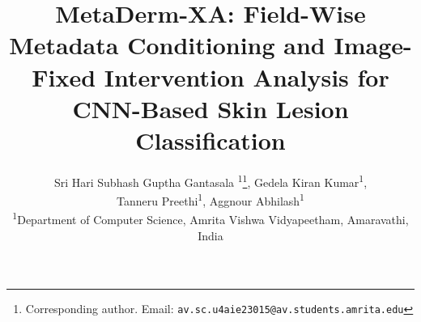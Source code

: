 \documentclass[12pt, a4paper]{article}
\begin{document}
\title{MetaDerm-XA: Field-Wise Metadata Conditioning and Image-Fixed Intervention Analysis for CNN-Based Skin Lesion Classification}

\author{
    Sri Hari Subhash Guptha Gantasala \textsuperscript{1}\thanks{Corresponding author. Email: \texttt{av.sc.u4aie23015@av.students.amrita.edu}},
    Gedela Kiran Kumar\textsuperscript{1}, \\
    Tanneru Preethi\textsuperscript{1},
    Aggnour Abhilash\textsuperscript{1} \\[6pt]
    {\small \textsuperscript{1}Department of Computer Science, Amrita Vishwa Vidyapeetham, Amaravathi, India} \\
}

\date{}
\maketitle
\end{document}
